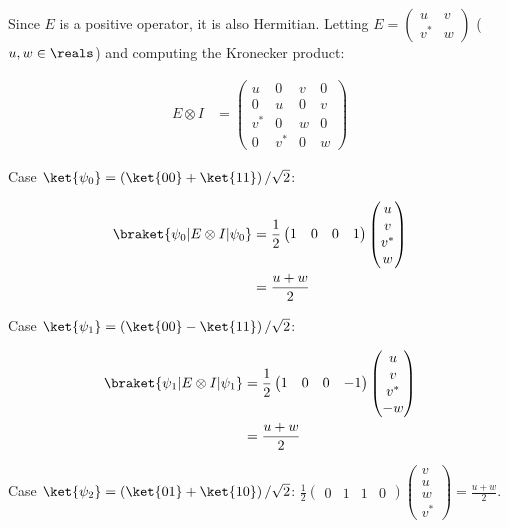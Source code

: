 \par Since $E$ is a positive operator, it is also Hermitian. Letting $E =
\begin{pmatrix} u & v \\ v^* & w \end{pmatrix}$ ($u, w \in \reals$) and
computing the Kronecker product:

\begin{align}
E \otimes I &= \begin{pmatrix} u & 0 & v & 0 \\ 0 & u & 0 & v \\ v^* & 0 & w & 0
\\ 0 & v^* & 0 & w \end{pmatrix}
\end{align}

\par Case $\ket{\psi_0} = \left( \ket{00} + \ket{11} \right) / \sqrt{2}$:

\begin{align}
\braket{\psi_0 | E \otimes I | \psi_0} &= \frac{1}{2} \begin{pmatrix} 1 & 0 & 0
& 1 \end{pmatrix} \begin{pmatrix} u \\ v \\ v^* \\ w \end{pmatrix} \\
&= \frac{u + w}{2}
\end{align}

\par Case $\ket{\psi_1} = \left( \ket{00} - \ket{11} \right) / \sqrt{2}$:

\begin{align}
\braket{\psi_1 | E \otimes I | \psi_1} &= \frac{1}{2} \begin{pmatrix} 1 & 0 & 0
& -1 \end{pmatrix} \begin{pmatrix} u \\ v \\ v^* \\ -w \end{pmatrix} \\
&= \frac{u + w}{2}
\end{align}

\par Case $\ket{\psi_2} = \left( \ket{01} + \ket{10} \right) / \sqrt{2}$:
$\frac{1}{2} \begin{pmatrix} 0 & 1 & 1 & 0 \end{pmatrix} \begin{pmatrix} v \\ u
\\ w \\ v^* \end{pmatrix} = \frac{u + w}{2}$.


